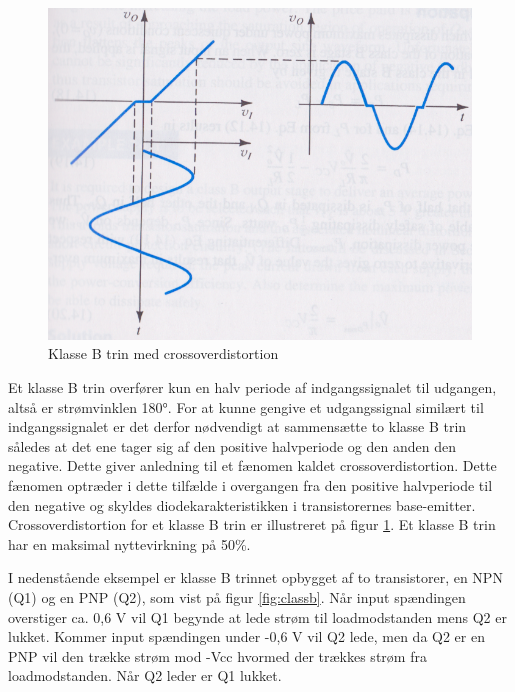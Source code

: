\begin{figure}[ht]
\begin{minipage}[b]{0.5\linewidth}
\includegraphics[scale=.25]{indledende_analyse/klasser/klassebproblem.png}
\caption{Klasse B trin med crossoverdistortion}
\label{fig:classbproblem}
\end{minipage}
\end{figure}

Et klasse B trin overfører kun en halv periode af indgangssignalet til udgangen, altså er strømvinklen 180°. For at kunne gengive et udgangssignal similært til indgangssignalet er det derfor nødvendigt at sammensætte to klasse B trin således at det ene tager sig af den positive halvperiode og den anden den negative. Dette giver anledning til et fænomen kaldet crossoverdistortion. Dette fænomen optræder i dette tilfælde i overgangen fra den positive halvperiode til den negative og skyldes diodekarakteristikken i transistorernes base-emitter. Crossoverdistortion for et klasse B trin er illustreret på figur \ref{fig:classbproblem}.
Et klasse B trin har en maksimal nyttevirkning på 50\%.

I nedenstående eksempel er klasse B trinnet opbygget af to transistorer, en NPN (Q1) og en PNP (Q2), som vist på figur \ref{fig:classb}. Når input spændingen overstiger ca. 0,6 V vil Q1 begynde at lede strøm til loadmodstanden mens Q2 er lukket. Kommer input spændingen under -0,6 V vil Q2 lede, men da Q2 er en PNP vil den trække strøm mod -Vcc hvormed der trækkes strøm fra loadmodstanden. Når Q2 leder er Q1 lukket. 

